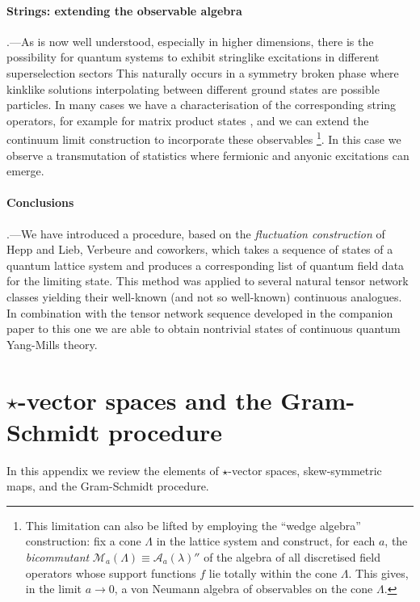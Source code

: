 \documentclass[prl,twocolumn,lengthcheck,superscriptaddress]{revtex4-1}
\theoremstyle{definition}
\theoremstyle{remark}
\begin{document}
\paragraph{Strings: extending the observable algebra}\hspace{-1em}.---As is now well understood, especially in higher dimensions, there is the possibility for quantum systems to exhibit stringlike excitations in different superselection sectors This naturally occurs in a symmetry broken phase where kinklike solutions interpolating between different ground states are possible particles. In many cases we have a characterisation of the corresponding string operators, for example for matrix product states \cite{perez-garcia:2008a}, and we can extend the continuum limit construction to incorporate these observables \footnote{This limitation can also be lifted by employing the ``wedge algebra'' construction: fix a cone $\Lambda$ in the lattice system and construct, for each $a$, the \emph{bicommutant} $\mathcal{M}_a(\Lambda) \equiv \mathcal{A}_a(\lambda)''$ of the algebra of all discretised field operators whose support functions $f$ lie totally within the cone $\Lambda$.  This gives, in the limit $a\rightarrow 0$, a von Neumann algebra of observables on the cone $\Lambda$.}. In this case we observe a transmutation of statistics where fermionic and anyonic excitations can emerge. 

\paragraph*{Conclusions}\hspace{-1em}.---We have introduced a procedure, based on the \emph{fluctuation construction} of Hepp and Lieb, Verbeure and coworkers, which takes a sequence of states of a quantum lattice system and produces a corresponding list of quantum field data for the limiting state. This method was applied to several natural tensor network classes yielding their well-known (and not so well-known) continuous analogues. In combination with the tensor network sequence developed in the companion paper to this one we are able to obtain nontrivial states of continuous quantum Yang-Mills theory.




\widetext
\appendix
\section{$\star$-vector spaces and the Gram-Schmidt procedure}\label{app:ags}
In this appendix we review the elements of $\star$-vector spaces, skew-symmetric maps, and the Gram-Schmidt procedure.
\end{document}
